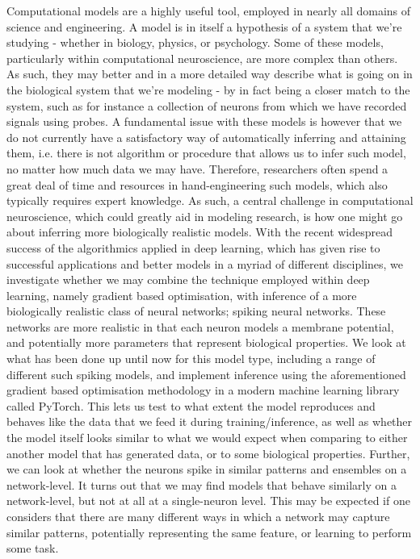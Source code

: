 \documentclass[mphil,deptreport,ianc]{infthesis} %
\begin{document}
\begin{preliminary}
Computational models are a highly useful tool, employed in nearly all domains of science and engineering. A model is in itself a hypothesis of a system that we’re studying - whether in biology, physics, or psychology.
Some of these models, particularly within computational neuroscience, are more complex than others. As such, they may better and in a more detailed way describe what is going on in the biological system that we’re modeling - by in fact being a closer match to the system, such as for instance a collection of neurons from which we have recorded signals using probes.
A fundamental issue with these models is however that we do not currently have a satisfactory way of automatically inferring and attaining them, i.e. there is not algorithm or procedure that allows us to infer such model, no matter how much data we may have.
Therefore, researchers often spend a great deal of time and resources in hand-engineering such models, which also typically requires expert knowledge.
As such, a central challenge in computational neuroscience, which could greatly aid in modeling research, is how one might go about inferring more biologically realistic models.
With the recent widespread success of the algorithmics applied in deep learning, which has given rise to successful applications and better models in a myriad of different disciplines, we investigate whether we may combine the technique employed within deep learning, namely gradient based optimisation, with inference of a more biologically realistic class of neural networks; spiking neural networks.
These networks are more realistic in that each neuron models a membrane potential, and potentially more parameters that represent biological properties.
We look at what has been done up until now for this model type, including a range of different such spiking models, and implement inference using the aforementioned gradient based optimisation methodology in a modern machine learning library called PyTorch.
This lets us test to what extent the model reproduces and behaves like the data that we feed it during training/inference, as well as whether the model itself looks similar to what we would expect when comparing to either another model that has generated data, or to some biological properties.
Further, we can look at whether the neurons spike in similar patterns and ensembles on a network-level.
It turns out that we may find models that behave similarly on a network-level, but not at all at a single-neuron level.
This may be expected if one considers that there are many different ways in which a network may capture similar patterns, potentially representing the same feature, or learning to perform some task.

\end{preliminary}
\end{document}

